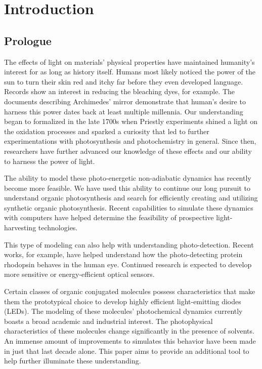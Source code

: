 \chapter{Introduction} \label{introduction}

\section{Prologue}

The effects of light on materials' physical properties have maintained humanity's interest for as long as history itself. Humans most likely noticed the power of the sun to turn their skin red and itchy far before they even developed language. Records show an interest in reducing the bleaching dyes, for example.\cite{roth1989beginnings} The documents describing Archimedes' mirror demonstrate that human's desire to harness this power dates back at least multiple millennia.\cite{claus1973archimedes} Our understanding began to formalized in the late 1700s when Priestly experiments shined a light on the oxidation processes and sparked a curiosity that led to further experimentations with photosynthesis and photochemistry in general.\cite{priestley1772observations} Since then, researchers have further advanced our knowledge of these effects and our ability to harness the power of light.

The ability to model these photo-energetic non-adiabatic dynamics has recently become more feasible.
We have used this ability to continue our long pursuit to understand organic photosynthesis and search for efficiently creating and utilizing synthetic organic photosynthesis. \cite{zheng2017photoinduced,caycedo2010light,balzani2008photochemical,engel2007evidence}
Recent capabilities to simulate these dynamics with computers have helped determine the feasibility of prospective light-harvesting technologies. \cite{ishida11_effic_excit_energ_trans_react,katan2005effects}

This type of modeling can also help with understanding photo-detection.
Recent works, for example, have helped understand how the photo-detecting protein rhodopsin behaves in the human eye.\cite{weingart2012modelling}
Continued research is expected to develop more sensitive or energy-efficient optical sensors. 

Certain classes of organic conjugated molecules possess characteristics that make them the prototypical choice to develop highly efficient light-emitting diodes (LEDs). 
The modeling of these molecules' photochemical dynamics currently boasts a broad academic and industrial interest. \cite{tavernelli2010nonadiabatic,tavernelli2015nonadiabatic,nelson2020non}
The photophysical characteristics of these molecules change significantly in the presence of solvents.
An immense amount of improvements to simulates this behavior have been made in just that last decade alone. This paper aims to provide an additional tool to help further illuminate these understanding.


